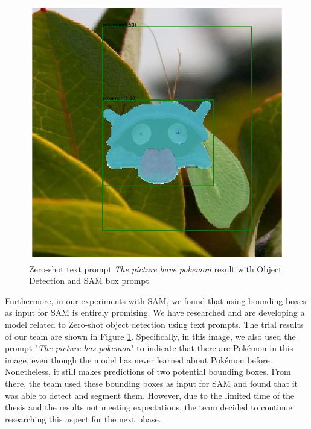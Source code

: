 \begin{figure}[t]
    \centering
    \includegraphics[width=0.75\linewidth]{img/groundedsam.png}
    \caption[Zero-shot text prompt result with Object Detection and SAM box prompt]{Zero-shot text prompt \textit{The picture have pokemon} result with Object Detection and SAM box prompt}
    \label{fig:groundedsam}
\end{figure}
Furthermore, in our experiments with SAM, we found that using bounding boxes as input for SAM is entirely promising. We have researched and are developing a model related to Zero-shot object detection using text prompts. The trial results of our team are shown in Figure \ref{fig:groundedsam}. Specifically, in this image, we also used the prompt "\textit{The picture has pokemon}" to indicate that there are Pokémon in this image, even though the model has never learned about Pokémon before. Nonetheless, it still makes predictions of two potential bounding boxes. From there, the team used these bounding boxes as input for SAM and found that it was able to detect and segment them. However, due to the limited time of the thesis and the results not meeting expectations, the team decided to continue researching this aspect for the next phase.